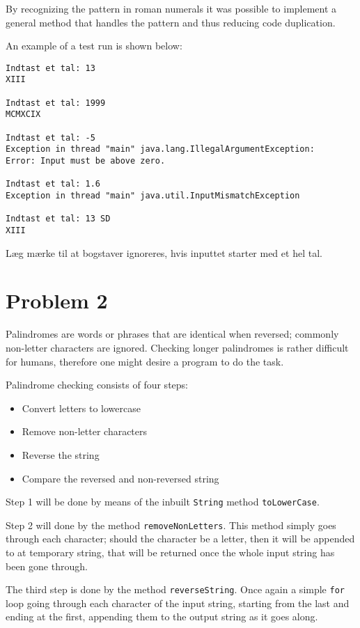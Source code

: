 \documentclass{scrartcl}
\newcommand\code[1]{\texttt{#1}}
\begin{document}
By recognizing the pattern in roman numerals it was possible to implement a general method that handles the pattern and thus reducing code duplication.

An example of a test run is shown below:

\begin{Verbatim}
Indtast et tal: 13
XIII

Indtast et tal: 1999
MCMXCIX

Indtast et tal: -5
Exception in thread "main" java.lang.IllegalArgumentException:
Error: Input must be above zero.

Indtast et tal: 1.6
Exception in thread "main" java.util.InputMismatchException

Indtast et tal: 13 SD
XIII
\end{Verbatim}

Læg mærke til at bogstaver ignoreres, hvis inputtet starter med et hel tal.

\section*{Problem 2}
Palindromes are words or phrases that are identical when reversed; commonly non-letter characters are ignored. Checking longer palindromes is rather difficult for humans, therefore one might desire a program to do the task.

Palindrome checking consists of four steps:
\begin{itemize}
\item Convert letters to lowercase
\item Remove non-letter characters
\item Reverse the string
\item Compare the reversed and non-reversed string
\end{itemize}
Step 1 will be done by means of the inbuilt \code{String} method \code{toLowerCase}.

Step 2 will done by the method \code{removeNonLetters}. This method simply goes through each character; should the character be a letter, then it will be appended to at temporary string, that will be returned once the whole input string has been gone through.

The third step is done by the method \code{reverseString}. Once again a simple \code{for} loop going through each character of the input string, starting from the last and ending at the first, appending them to the output string as it goes along.
\end{document}
